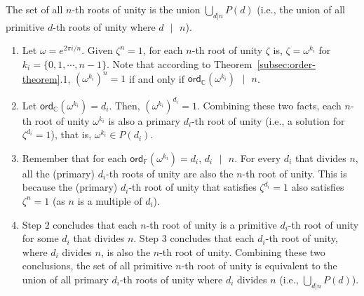 \begin{tcolorbox}[title={\textbf{\tboxtheorem{\ref*{subsec:roots-theorem}.3} Set of All $\bm{n}$-th Roots of Unity}}]
The set of all $n$-th roots of unity is the union $\bigcup_{d|n} P(d)$ (i.e., the union of all primitive $d$-th roots of unity where $d \text{ } | \text{ } n$).
\end{tcolorbox}
\begin{myproof}
    \begin{enumerate}
    \item Let $\omega = e^{2\pi i/n}$.
    Given $\zeta^n = 1$, for each $n$-th root of unity $\zeta$ is, $\zeta = \omega^{k_i}$ for $k_i = \{0, 1, \cdots, n-1\}$. Note that according to Theorem~\ref*{subsec:order-theorem}.1, $(\omega^{k_i})^n = 1$ if and only if $\textsf{ord}_{\mathbb{C}}(\omega^{k_i}) \text{ } | \text{ } n$. 
    \item Let $\textsf{ord}_{\mathbb{C}}(\omega^{k_i}) = d_i$. Then, $(\omega^{k_i})^{d_i} = 1$. Combining these two facts, each $n$-th root of unity $\omega^{k_i}$ is also a primary $d_i$-th root of unity (i.e., a solution for $\zeta^{d_i} = 1$), that is, $\omega^{k_i} \in P(d_i)$. 
    \item Remember that for each $\textsf{ord}_{\mathbb{F}}(\omega^{k_i}) = d_i$, $d_i \text{ } | \text{ } n$. For every $d_i$ that divides $n$, all the (primary) $d_i$-th roots of unity are also the $n$-th root of unity. This is because the (primary) $d_i$-th root of unity that satisfies $\zeta^{d_i} = 1$ also satisfies $\zeta^{n} = 1$ (as $n$ is a multiple of $d_i$).
    \item Step 2 concludes that each $n$-th root of unity is a primitive $d_i$-th root of unity for some $d_i$ that divides $n$. Step 3 concludes that each $d_i$-th root of unity, where $d_i$ divides $n$, is also the $n$-th root of unity. Combining these two conclusions, the set of all primitive $n$-th root of unity is equivalent to the union of all primary $d_i$-th roots of unity where $d_i$ divides $n$ (i.e., $\bigcup_{d|n} P(d)$). 
    \end{enumerate}
\end{myproof}

